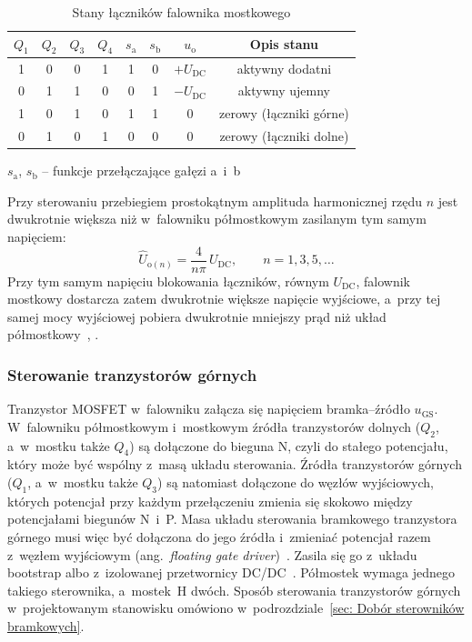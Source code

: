 \begin{table}[htbp]
  \centering
  \caption{Stany łączników falownika mostkowego}
  \label{tab:stany-mostka}
  \begin{tabular}{cccccccc}
    \toprule
    $Q_1$ & $Q_2$ & $Q_3$ & $Q_4$ & $s_\mathrm{a}$ & $s_\mathrm{b}$
      & $u_\mathrm{o}$ & Opis stanu \\
    \midrule
    1 & 0 & 0 & 1 & 1 & 0 & $+U_\mathrm{DC}$ & aktywny dodatni \\
    0 & 1 & 1 & 0 & 0 & 1 & $-U_\mathrm{DC}$ & aktywny ujemny \\
    1 & 0 & 1 & 0 & 1 & 1 & $0$ & zerowy (łączniki górne) \\
    0 & 1 & 0 & 1 & 0 & 0 & $0$ & zerowy (łączniki dolne) \\
    \bottomrule
  \end{tabular}

  \smallskip
    $s_\mathrm{a}$, $s_\mathrm{b}$ -- funkcje przełączające gałęzi a~i~b
\end{table}

Przy sterowaniu przebiegiem prostokątnym amplituda harmonicznej rzędu $n$
jest dwukrotnie większa niż w~falowniku półmostkowym zasilanym tym samym
napięciem:
\begin{equation}
  \hat{U}_{\mathrm{o}(n)} = \frac{4}{n\pi}\, U_\mathrm{DC},
  \qquad n = 1, 3, 5, \ldots
  \label{eq:mostek-harm}
\end{equation}
Przy tym samym napięciu blokowania łączników, równym $U_\mathrm{DC}$,
falownik mostkowy dostarcza zatem dwukrotnie większe napięcie wyjściowe,
a~przy tej samej mocy wyjściowej pobiera dwukrotnie mniejszy prąd niż układ
półmostkowy~\cite[s.~5, 7--8]{instrukcja}, \cite[podrozdz.~8-3-2]{mohan2003}.

\subsubsection*{Sterowanie tranzystorów górnych}

Tranzystor MOSFET w~falowniku załącza się napięciem bramka--źródło
$u_\mathrm{GS}$. W~falowniku półmostkowym i~mostkowym źródła tranzystorów
dolnych ($Q_2$, a~w~mostku także $Q_4$) są dołączone do bieguna N, czyli do
stałego potencjału, który może być wspólny z~masą układu sterowania. Źródła
tranzystorów górnych ($Q_1$, a~w~mostku także $Q_3$) są natomiast dołączone
do węzłów wyjściowych, których potencjał przy każdym przełączeniu zmienia się
skokowo między potencjałami biegunów N~i~P. Masa układu sterowania bramkowego
tranzystora górnego musi więc być dołączona do jego źródła i~zmieniać
potencjał razem z~węzłem wyjściowym (ang.~\textit{floating gate
driver})~\cite[s.~29]{mohan2012}. Zasila się go z~układu bootstrap albo
z~izolowanej przetwornicy DC/DC~\cite[s.~15]{instrukcja}. Półmostek wymaga
jednego takiego sterownika, a~mostek~H dwóch. Sposób sterowania
tranzystorów górnych w~projektowanym stanowisku omówiono
w~podrozdziale~\ref{sec: Dobór sterowników bramkowych}.

